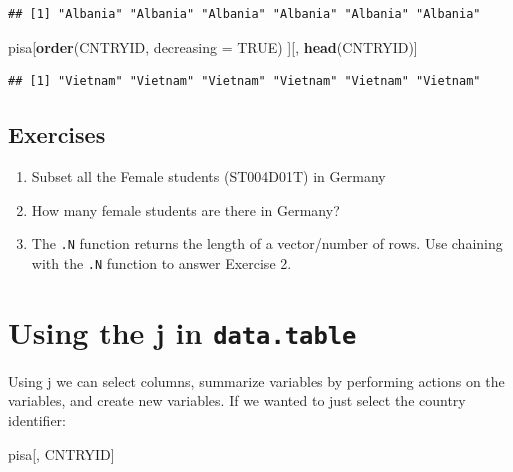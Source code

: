 \documentclass[]{book}
\newenvironment{Shaded}{\begin{snugshade}}{\end{snugshade}}
\newcommand{\DataTypeTok}[1]{\textcolor[rgb]{0.13,0.29,0.53}{#1}}
\newcommand{\KeywordTok}[1]{\textcolor[rgb]{0.13,0.29,0.53}{\textbf{#1}}}
\newcommand{\NormalTok}[1]{#1}
\newcommand{\OtherTok}[1]{\textcolor[rgb]{0.56,0.35,0.01}{#1}}
\providecommand{\tightlist}{%
  \setlength{\itemsep}{0pt}\setlength{\parskip}{0pt}}
\begin{document}
\begin{verbatim}
## [1] "Albania" "Albania" "Albania" "Albania" "Albania" "Albania"
\end{verbatim}

\begin{Shaded}
\begin{Highlighting}[]
\NormalTok{pisa[}\KeywordTok{order}\NormalTok{(CNTRYID, }\DataTypeTok{decreasing =} \OtherTok{TRUE}\NormalTok{)}
\NormalTok{     ][,}
       \KeywordTok{head}\NormalTok{(CNTRYID)]}
\end{Highlighting}
\end{Shaded}

\begin{verbatim}
## [1] "Vietnam" "Vietnam" "Vietnam" "Vietnam" "Vietnam" "Vietnam"
\end{verbatim}

\hypertarget{exercises-1}{%
\subsection{Exercises}\label{exercises-1}}

\begin{enumerate}
\def\labelenumi{\arabic{enumi}.}
\tightlist
\item
  Subset all the Female students (ST004D01T) in Germany
\item
  How many female students are there in Germany?
\item
  The \texttt{.N} function returns the length of a vector/number of rows. Use chaining with the \texttt{.N} function to answer Exercise 2.
\end{enumerate}

\hypertarget{using-the-j-in-data.table}{%
\section{\texorpdfstring{Using the j in \texttt{data.table}}{Using the j in data.table}}\label{using-the-j-in-data.table}}

Using j we can select columns, summarize variables by performing actions on the variables, and create new variables. If we wanted to just select the country identifier:

\begin{Shaded}
\begin{Highlighting}[]
\NormalTok{pisa[,}
\NormalTok{     CNTRYID]}
\end{Highlighting}
\end{Shaded}
\end{document}

